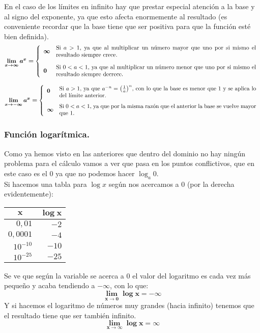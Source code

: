 \documentclass[a4paper,11pt,answers]{exam}
\begin{document}
En el caso de los límites en infinito hay que prestar especial atención a la base y al signo del exponente, ya que esto afecta enormemente al resultado (es conveniente recordar que la base tiene que ser positiva para que la función esté bien definida).\\
\[\boldsymbol{\lim_{x \to \infty} a^x =} \left\lbrace
\begin{array}{ll}
\boldsymbol{\infty}&\text{\parbox{12cm}{Si $a>1$, ya que al multiplicar un número mayor que uno por si mismo el resultado siempre crece.}}\\
&\\
\boldsymbol{0}&\text{\parbox{12cm}{Si $0<a<1$, ya que al multiplicar un número menor que uno por si mismo el resultado siempre decrece.}}\\
\end{array}\right.\]

\[\boldsymbol{\lim_{x \to -\infty} a^x =} \left\lbrace
\begin{array}{ll}
\boldsymbol{0}&\text{\parbox{12cm}{Si $a>1$, ya que $a^{-n} = \left(\frac{1}{a}\right)^n$, con lo que la base es menor que 1 y se aplica lo del límite anterior.}}\\
&\\
\boldsymbol{\infty}&\text{\parbox{12cm}{Si $0<a<1$, ya que por la misma razón que el anterior la base se vuelve mayor que 1.}}\\
\end{array}\right.\]

\subsubsection{Función logarítmica.}
Como ya hemos visto en las anteriores que dentro del dominio no hay ningún problema para el cálculo vamos a ver que pasa en los puntos conflictivos, que en este caso es el 0 ya que no podemos hacer $\log_a 0$.\\

Si hacemos una tabla para $\log x$ según nos acercamos a 0 (por la derecha evidentemente):
\begin{center}
\begin{tabular}{r|r}
\multicolumn{1}{c|}{$\boldsymbol{x}$} & \multicolumn{1}{c}{$\boldsymbol{\log x}$} \\ 
\hline
$0,01$&$-2$\\
$0,0001$&$-4$\\
$10^{-10}$&$-10$\\
$10^{-25}$&$-25$
\end{tabular}
\end{center}
Se ve que según la variable se acerca a 0 el valor del logaritmo es cada vez más pequeño y acaba tendiendo a $-\infty$, con lo que:
\[\boldsymbol{\lim_{x \to 0} \log x = -\infty}\]
Y si hacemos el logaritmo de números muy grandes (hacia infinito) tenemos que el resultado tiene que ser también infinito.
\[\boldsymbol{\lim_{x \to \infty} \log x = \infty}\]
\end{document}
